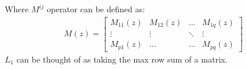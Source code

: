 \documentclass{article}[12pt]
\newcommand{\norm}[1]{\left|\left|#1\right|\right|}
\begin{document}
    Where $M^{ij}$ operator can be defined as:
    \begin{align*}
        M(z) = \begin{bmatrix}M_{11}(z)&M_{12}(z)&\dots&M_{1q}(z)\\ \vdots&\vdots&\ddots&\vdots \\ M_{p1}(z)&\dots&\dots&M_{pq}(z)\end{bmatrix}
    \end{align*}
    $L_1$ can be thought of as taking the max row sum of a matrix.
    
    
\end{document}
